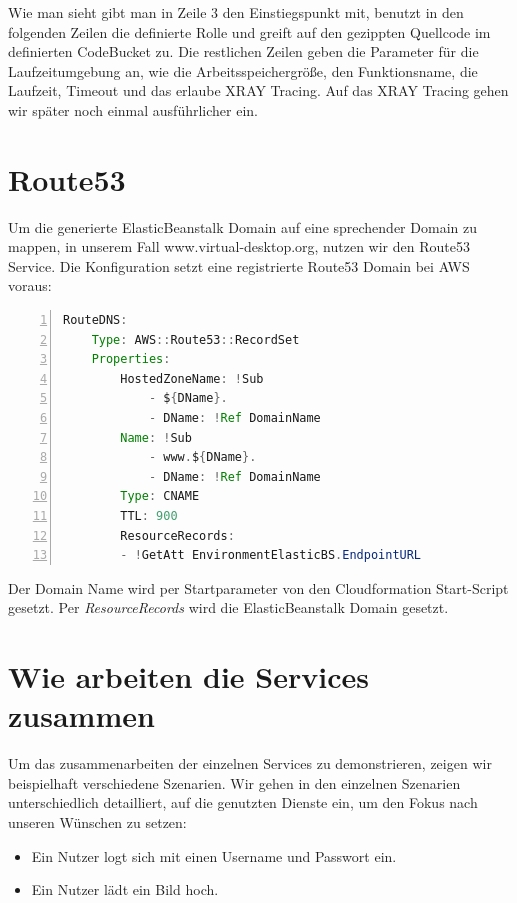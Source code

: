 \documentclass[a4paper, 12pt]{scrreprt}
\renewcommand\_{\textunderscore\allowbreak}
\begin{document}
Wie man sieht gibt man in Zeile 3 den Einstiegspunkt mit, benutzt in den folgenden Zeilen die definierte Rolle und greift auf den gezippten Quellcode im definierten CodeBucket zu. Die restlichen Zeilen geben die Parameter für die Laufzeitumgebung an, wie die Arbeitsspeichergröße, den Funktionsname, die Laufzeit, Timeout und das erlaube XRAY Tracing. Auf das XRAY Tracing gehen wir später noch einmal ausführlicher ein.

\section{Route53}
Um die generierte ElasticBeanstalk Domain auf eine sprechender Domain zu mappen, in unserem Fall www.virtual-desktop.org, nutzen wir den Route53 Service. Die Konfiguration setzt eine registrierte Route53 Domain bei AWS voraus:

\begin{lstlisting}[xleftmargin=\parindent,numbers=left,numberstyle=\small,numbersep=8pt,frame=L,mathescape=true, basicstyle=\small, language=Java, lineskip={1.0pt}]
RouteDNS:
    Type: AWS::Route53::RecordSet
    Properties:
        HostedZoneName: !Sub
            - ${DName}.
            - DName: !Ref DomainName
        Name: !Sub
            - www.${DName}.
            - DName: !Ref DomainName
        Type: CNAME
        TTL: 900
        ResourceRecords:
        - !GetAtt EnvironmentElasticBS.EndpointURL
\end{lstlisting}

Der Domain Name wird per Startparameter von den Cloudformation Start-Script gesetzt. Per \textit{ResourceRecords} wird die ElasticBeanstalk Domain gesetzt.
 
\section{Wie arbeiten die Services zusammen}
%

Um das zusammenarbeiten der einzelnen Services zu demonstrieren, zeigen wir beispielhaft verschiedene Szenarien. Wir gehen in den einzelnen Szenarien unterschiedlich detailliert, auf die genutzten Dienste ein, um den Fokus nach unseren Wünschen zu setzen:
\begin{itemize}
\item Ein Nutzer logt sich mit einen Username und Passwort ein.
\item Ein Nutzer lädt ein Bild hoch.
\end{itemize}
\end{document}
